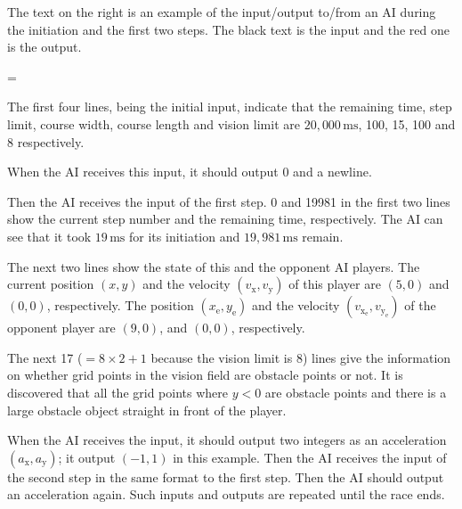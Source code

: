 \documentclass[11pt]{article}
\begin{document}
\begin{minipage}[t]{.6\textwidth}

The text on the right is an example of the input/output to/from an AI
during the initiation and the first two steps.
The black text is the input and the red one is the output.

\parindent=

The first four lines, being the initial input, indicate that
the remaining time, step limit, course width, course length and vision limit
are $20,000\,\si{\milli\second}$, 100, 15, 100 and 8 respectively.

When the AI receives this input, it should output 0 and a newline.

Then the AI receives the input of the first step.
0 and 19981 in the first two lines show the current step number
and the remaining time, respectively.
The AI can see that it took $19\,\si{\milli\second}$ for its initiation and
$19,981\,\si{\milli\second}$ remain.

The next two lines show the state of this and the opponent AI players.
The current position $(x,y)$ and the velocity $(v_\mathrm{x},v_\mathrm{y})$ of this player are $(5,0)$ and
$(0,0)$, respectively.
The position $(x_\mathrm{e},y_\mathrm{e})$ and the velocity $(v_{\mathrm{x}_\mathrm{e}},v_{\mathrm{y}_\mathrm{e}})$ of the opponent player are
$(9,0)$, and $(0,0)$, respectively.

The next 17 ($=8 \times 2 + 1$ because the vision limit is 8) lines give the information on whether grid points in the vision field are obstacle points or not.
It is discovered that all the grid points where $y < 0$ are obstacle points
and there is a large obstacle object straight in front of the player.

When the AI receives the input, it should output two integers as an acceleration $(a_\mathrm{x}, a_\mathrm{y})$;
it output $(-1,1)$ in this example.
Then the AI receives the input of the second step
in the same format to the first step.
Then the AI should output an acceleration again.
Such inputs and outputs are repeated until the race ends.

\end{minipage}
 \hfill
\end{document}
